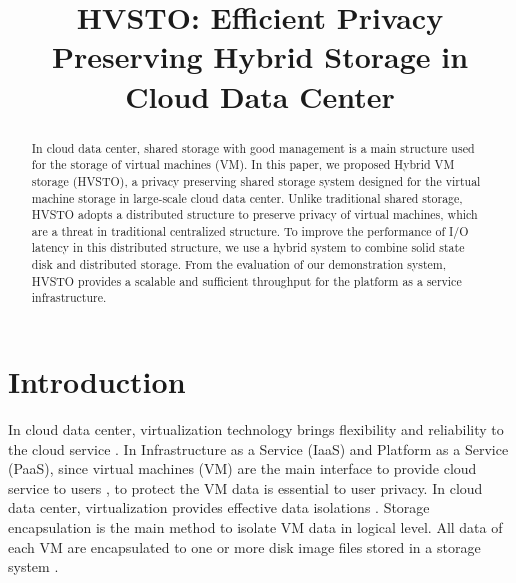 \documentclass[conference]{IEEEtran}
\begin{document}
\title{HVSTO: Efficient Privacy Preserving Hybrid  Storage in Cloud Data Center}


\author{




 
}









\maketitle


\begin{abstract}
In cloud data center, shared storage with good management is a main structure used for the storage of virtual machines (VM). In this paper, we proposed Hybrid VM storage (HVSTO), a privacy preserving shared storage system designed for the virtual machine storage in large-scale cloud data center. Unlike traditional shared storage, HVSTO adopts a distributed structure to preserve privacy of virtual machines, which are a threat in traditional centralized structure. To improve the performance of I/O latency in this distributed structure, we use a hybrid system to combine solid state disk and distributed storage. From the evaluation of our demonstration system, HVSTO provides a scalable and sufficient throughput for the platform as a service infrastructure.


\end{abstract}





\IEEEpeerreviewmaketitle


\section{Introduction}
In cloud data center, virtualization technology brings flexibility and reliability to the cloud service \cite{Winter2009}\cite{Carr2009}.  In Infrastructure as a Service (IaaS) and Platform as a Service (PaaS), since virtual machines (VM) are the main interface to provide cloud service to users \cite{Mell2011}, to protect the VM data is essential to user privacy. In cloud data center, virtualization provides effective data isolations \cite{Vaquero2008}. Storage encapsulation is the main method to isolate VM data in logical level. All data of each VM are encapsulated to one or more disk image files stored in a storage system \cite{Sotomayor2009}.
\end{document}
